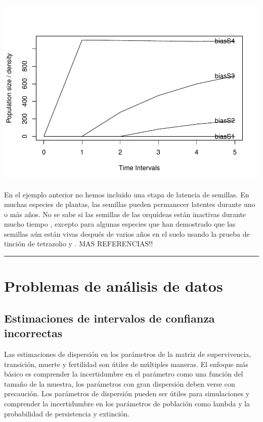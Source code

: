 \documentclass[
]{book}
\theoremstyle{definition}
\theoremstyle{definition}
\theoremstyle{definition}
\theoremstyle{definition}
\theoremstyle{remark}
\begin{document}
\includegraphics{Diagnostico_Poblacional_files/figure-latex/unnamed-chunk-46-2.pdf}

En el ejemplo anterior no hemos incluido una etapa de latencia de semillas. En muchas especies de plantas, las semillas pueden permanecer latentes durante uno o más años. No se sabe si las semillas de las orquídeas están inactivas durante mucho tiempo \citet{gale2010restricciones}, excepto para algunas especies que han demostrado que las semillas aún están vivas después de varios años en el suelo usando la prueba de tinción de tetrazolio \citet{rasmussen1993seed} y \citet{whigham2006seed}. MAS REFERENCIAS!!

\begin{center}\rule{0.5\linewidth}{0.5pt}\end{center}

\section{Problemas de análisis de datos}\label{problemas-de-anuxe1lisis-de-datos}

\subsection{Estimaciones de intervalos de confianza incorrectas}\label{estimaciones-de-intervalos-de-confianza-incorrectas}

Las estimaciones de dispersión en los parámetros de la matriz de supervivencia, transición, muerte y fertilidad son útiles de múltiples maneras. El enfoque más básico es comprender la incertidumbre en el parámetro como una función del tamaño de la muestra, los parámetros con gran dispersión deben verse con precaución. Los parámetros de dispersión pueden ser útiles para simulaciones y comprender la incertidumbre en los parámetros de población como lambda y la probabilidad de persistencia y extinción.
\end{document}
